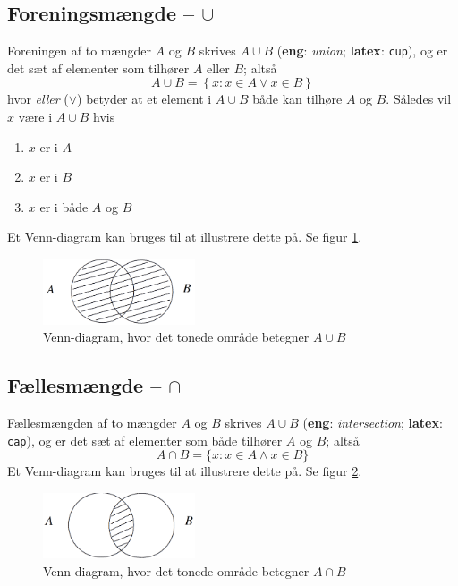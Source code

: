 \subsection{Foreningsmængde \texorpdfstring{-- $\cup$}{}}
Foreningen af to mængder $A$ og $B$ skrives $A\cup B$ (\textbf{eng}: \textit{union}; \textbf{latex}: \texttt{cup}), og er det sæt af elementer som tilhører $A$ eller $B$; altså \[A\cup B = \left\{ x:x\in A \lor x\in B\right\}\]
hvor \textit{eller} ($\lor$) betyder at et element i $A\cup B$ både kan tilhøre $A$ og $B$. Således vil $x$ være i $A\cup B$ hvis
\begin{enumerate}
    \item $x$ er i $A$
    \item $x$ er i $B$
    \item $x$ er i både $A$ og $B$
\end{enumerate}
Et Venn-diagram kan bruges til at illustrere dette på. Se figur \ref{fig:foreningvenn}.
\begin{figure}[H]
    \centering
    \includegraphics[width=0.4\textwidth]{billeder/Acrobat_h4xoc29CTB.png}
    \caption{Venn-diagram, hvor det tonede område betegner $A\cup B$}
    \label{fig:foreningvenn}
\end{figure}
\subsection{Fællesmængde \texorpdfstring{-- $\cap$}{}}
Fællesmængden af to mængder $A$ og $B$ skrives $A\cup B$ (\textbf{eng}: \textit{intersection}; \textbf{latex}: \texttt{cap}), og er det sæt af elementer som både tilhører $A$ og $B$; altså \[A\cap B=\{ x:x\in A \land x\in B\}\]
Et Venn-diagram kan bruges til at illustrere dette på. Se figur \ref{fig:fellesvenn}.
\begin{figure}[H]
    \centering
    \includegraphics[width=0.4\textwidth]{billeder/Acrobat_bHAl8Wuekv.png}
    \caption{Venn-diagram, hvor det tonede område betegner $A\cap B$}
    \label{fig:fellesvenn}
\end{figure}

